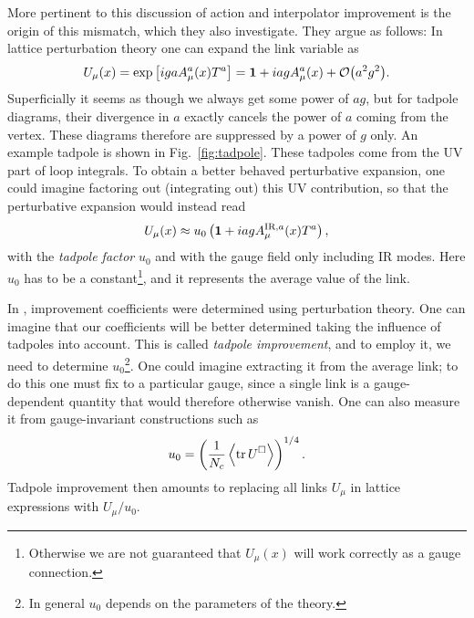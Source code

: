 More pertinent to this discussion of action and interpolator improvement
is the origin of this mismatch, which they also investigate. They argue as
follows: In lattice perturbation theory one can expand the link variable as
\begin{equation}
  U_\mu(x)=\exp\left[igaA_\mu^a(x)T^a\right]
          =\id+iagA_\mu^a(x)+\order{a^2g^2}.
\end{equation}
Superficially it seems as though we always get some power of $ag$, but for
tadpole diagrams, their divergence in $a$ exactly cancels the power of $a$ 
coming from the vertex. These diagrams therefore are suppressed by a
power of $g$ only. An example tadpole is shown in Fig.~\ref{fig:tadpole}.
These tadpoles come from the UV part of loop integrals. To obtain a
better behaved perturbative expansion, one could imagine factoring out
(integrating out) this UV contribution, so that the perturbative expansion
would instead read
\begin{equation}
  U_\mu(x)\approx u_0\left({\mathbf 1}+iagA^{\text{IR},a}_\mu(x)T^a\right),
\end{equation}
with the {\it tadpole factor} $u_0$ and with the gauge field only including 
IR modes. Here $u_0$ has to be a constant\footnote{Otherwise we are not
guaranteed that $U_\mu(x)$ will work correctly as a gauge connection.}, 
and it represents the average value of the link.

In , improvement coefficients were
determined using perturbation theory. One can imagine that our coefficients
will be better determined taking the influence of tadpoles into account.
This is called {\it tadpole improvement}, and to employ it, we need to
determine $u_0$\footnote{In general $u_0$ depends on the parameters of the
theory.}. One could imagine extracting it from the average link; to do
this one must fix to a particular gauge, since a single link is a
gauge-dependent quantity that would therefore otherwise vanish. One
can also measure it from gauge-invariant constructions such as
\begin{equation}
  u_0=\left(\frac{1}{N_c}\ev{\tr \plaq}\right)^{1/4}.
\end{equation}
Tadpole improvement then amounts to replacing all links $U_\mu$ in lattice
expressions with $U_\mu/u_0$.

